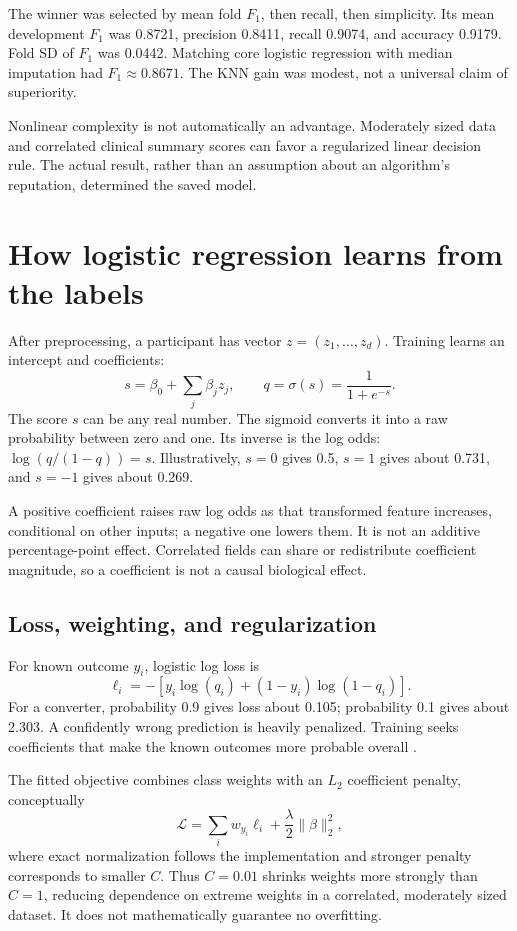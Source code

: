 The winner was selected by mean fold $F_1$, then recall, then simplicity. Its mean development $F_1$ was 0.8721, precision 0.8411, recall 0.9074, and accuracy 0.9179. Fold SD of $F_1$ was 0.0442. Matching core logistic regression with median imputation had $F_1\approx0.8671$. The KNN gain was modest, not a universal claim of superiority.

Nonlinear complexity is not automatically an advantage. Moderately sized data and correlated clinical summary scores can favor a regularized linear decision rule. The actual result, rather than an assumption about an algorithm's reputation, determined the saved model.
\clearpage

\section{How logistic regression learns from the labels}
After preprocessing, a participant has vector $z=(z_1,\ldots,z_d)$. Training learns an intercept and coefficients:
\begin{equation}s=\beta_0+\sum_j\beta_j z_j,\qquad q=\sigma(s)=\frac{1}{1+e^{-s}}.
\end{equation}
The score $s$ can be any real number. The sigmoid converts it into a raw probability between zero and one. Its inverse is the log odds: $\log(q/(1-q))=s$. Illustratively, $s=0$ gives 0.5, $s=1$ gives about 0.731, and $s=-1$ gives about 0.269.

A positive coefficient raises raw log odds as that transformed feature increases, conditional on other inputs; a negative one lowers them. It is not an additive percentage-point effect. Correlated fields can share or redistribute coefficient magnitude, so a coefficient is not a causal biological effect.

\subsection{Loss, weighting, and regularization}
For known outcome $y_i$, logistic log loss is
\begin{equation}\ell_i=-[y_i\log(q_i)+(1-y_i)\log(1-q_i)].\end{equation}
For a converter, probability 0.9 gives loss about 0.105; probability 0.1 gives about 2.303. A confidently wrong prediction is heavily penalized. Training seeks coefficients that make the known outcomes more probable overall \cite{logistic}.

The fitted objective combines class weights with an $L_2$ coefficient penalty, conceptually
\begin{equation}\mathcal L=\sum_iw_{y_i}\ell_i+\frac{\lambda}{2}\|\beta\|_2^2,
\end{equation}
where exact normalization follows the implementation and stronger penalty corresponds to smaller $C$. Thus $C=0.01$ shrinks weights more strongly than $C=1$, reducing dependence on extreme weights in a correlated, moderately sized dataset. It does not mathematically guarantee no overfitting.

